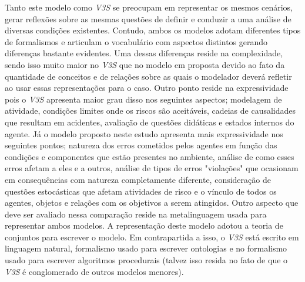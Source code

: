 Tanto este modelo como \textit{V3S} se preocupam em representar os mesmos cenários, gerar reflexões sobre as mesmas questões de definir e conduzir a uma análise de diversas condições existentes. Contudo, ambos os modelos adotam diferentes tipos de formalismos e articulam o vocabulário com aspectos distintos gerando diferenças bastante evidentes. Uma dessas diferenças reside na complexidade, sendo isso muito maior no \textit{V3S} que no modelo em proposta devido ao fato da quantidade de conceitos e de relações sobre as quais o modelador deverá refletir ao usar essas representações para o caso. Outro ponto reside na expressividade pois o \textit{V3S} apresenta maior grau disso nos seguintes aspectos; modelagem de atividade, condições limites onde os riscos são aceitáveis, cadeias de causalidades que resultam em acidentes, avaliação de questões didáticas e estados internos do agente. Já o modelo proposto neste estudo apresenta mais expressividade nos seguintes pontos; natureza dos erros cometidos pelos agentes em função das condições e componentes que estão presentes no ambiente, análise de como esses erros afetam a eles e a outros, análise de tipos de erros "violações" que ocasionam em consequências com natureza completamente diferente, consideração de questões estocásticas que afetam atividades de risco e o vínculo de todos os agentes, objetos e relações com os objetivos a serem atingidos. Outro aspecto que deve ser avaliado nessa comparação reside na metalinguagem usada para representar ambos modelos. A representação deste modelo adotou a teoria de conjuntos para escrever o modelo. Em contrapartida a isso, o \textit{V3S} está escrito em linguagem natural, formalismo usado para escrever ontologias e no formalismo usado para escrever algoritmos procedurais (talvez isso resida no fato de que o \textit{V3S} é conglomerado de outros modelos menores).